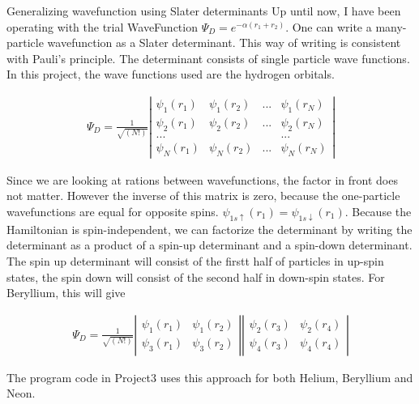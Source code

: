 \documentclass[a4paper, 12pt, titlepage]{article}
\begin{document}
\begin{section}{Generalizing wavefunction using Slater determinants}
 Up until now, I have been operating with the trial WaveFunction $\Psi_D = e^{-\alpha(r_1 + r_2)}$. One can write a many-particle wavefunction as a Slater determinant. This way of writing is consistent with Pauli's principle. The determinant consists of single particle wave functions. In this project, the wave functions used are the hydrogen orbitals. 

 \begin{align*}
 	\Psi_D = \frac{1}{\sqrt{(N!)}}\left| \begin{matrix}
 		\psi_1(r_1) & \psi_1(r_2) & ... & \psi_1(r_N) \\
 		\psi_2(r_1) & \psi_2(r_2) & ... & \psi_2(r_N) \\
 		... & & & ... \\
 		\psi_N(r_1) & \psi_N(r_2) & ... & \psi_N(r_N) 
 	\end{matrix} \right|
 \end{align*}

 Since we are looking at rations between wavefunctions, the factor in front does not matter. However the inverse of this matrix is zero, because the one-particle wavefunctions are equal for opposite spins. $\psi_{1s \uparrow}(r_1) = \psi_{1s\downarrow}(r_1)$. Because the Hamiltonian is spin-independent, we can factorize the determinant by writing the determinant as a product of a spin-up determinant and a spin-down determinant. The spin up determinant will consist of the firstt half of particles in up-spin states, the spin down will consist of the second half in down-spin states. For Beryllium, this will give

 \begin{align*}
 	\Psi_D = \frac{1}{\sqrt{(N!)}}\left| \begin{matrix}
 		\psi_1(r_1) & \psi_1(r_2) \\
 		\psi_3(r_1) & \psi_3(r_2) \end{matrix} \right| \left| \begin{matrix} \psi_2(r_3) & \psi_2(r_4) \\ \psi_4(r_3) & \psi_4(r_4)
 	\end{matrix} \right|
 \end{align*}

 The program code in Project3 uses this approach for both Helium, Beryllium and Neon. 
\end{section}
\end{document}
